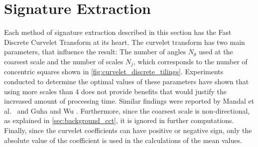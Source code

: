 \section{Signature Extraction}\label{sec:solution_signature_extraction}

Each method of signature extraction described in this section has the Fast
Discrete Curvelet Transform at its heart. The curvelet transform has two main
parameters, that influence the result: The number of angles $N_{\theta}$ used
at the coarsest scale and the number of scales $N_j$, which corresponds to the
number of concentric squares shown in \autoref{fig:curvelet_discrete_tilings}.
Experiments conducted to determine the optimal values of these parameters have
shown that using more scales than 4 does not provide benefits that would
justify the increased amount of processing time. Similar findings were reported
by Mandal et al.\ \autocite{mandal_curvelet_2009} and Guha and Wu
\autocite{guha_curvelet_????}. Furthermore, since the coarsest scale is
non-directional, as explained in \autoref{sec:background_cct}, it is ignored in
further computations. Finally, since the curvelet coefficients can have
positive or negative sign, only the absolute value of the coefficient is used
in the calculations of the mean values.


